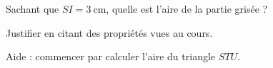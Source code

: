 
\begin{exercice}\label{exo2smath-0309}

    Sachant que $ SI=\SI{3}{\centi\meter}$, quelle est l'aire de la partie grisée ?

\begin{center}
   
\end{center}
Justifier en citant des propriétés vues au cours.

Aide : commencer par calculer l'aire du triangle \( STU\).

\end{exercice}
